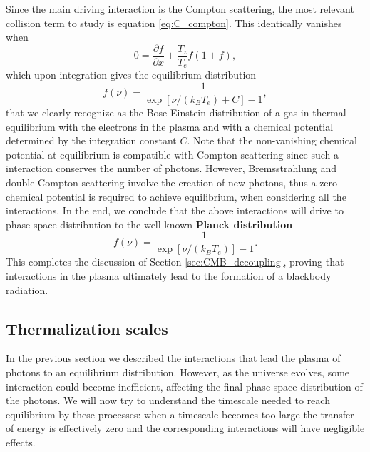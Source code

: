 Since the main driving interaction is the Compton scattering, the most relevant collision term to study is equation \eqref{eq:C_compton}. This identically vanishes when
$$0=\frac{\partial f}{\partial x}+\frac{T_z}{T_e}f(1+f),$$
which upon integration gives the equilibrium distribution
$$f(\nu)=\frac{1}{\exp[\nu/(k_BT_e)+C]-1},$$
that we clearly recognize as the Bose-Einstein distribution of a gas in thermal equilibrium with the electrons in the plasma and with a chemical potential determined by the integration constant  $C$. Note that the non-vanishing chemical potential at equilibrium is compatible with Compton scattering since such a interaction conserves the number of photons. However, Bremsstrahlung and double Compton scattering involve the creation of new photons, thus a zero chemical potential is required to achieve equilibrium, when considering all the interactions. In the end, we conclude that the above interactions will drive to phase space distribution to the well known \textbf{Planck distribution}
$$f(\nu)=\frac{1}{\exp[\nu/(k_BT_e)]-1}.$$
This completes the discussion of Section \ref{sec:CMB_decoupling}, proving that interactions in the plasma ultimately lead to the formation of a blackbody radiation.
\subsection{Thermalization scales}
\label{sec:ThermalizationScales}
In the previous section we described the interactions that lead the plasma of photons to an equilibrium distribution. However, as the universe evolves, some interaction could become inefficient, affecting the final phase space distribution of the photons. We will now try to understand the timescale needed to reach equilibrium by these processes: when a timescale becomes too large the transfer of energy is effectively zero and the corresponding interactions will have negligible effects.

